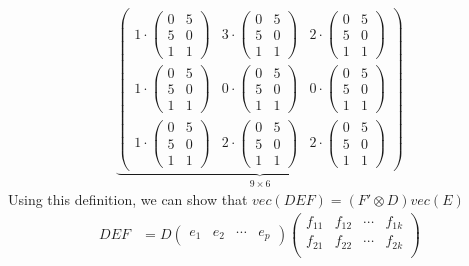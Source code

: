 \begin{enumerate}
\begin{align*}
\underbrace{\begin{pmatrix} 1\cdot\begin{pmatrix}0&5\\5&0\\1&1 \end{pmatrix}&3\cdot\begin{pmatrix}0&5\\5&0\\1&1 \end{pmatrix}&2\cdot\begin{pmatrix}0&5\\5&0\\1&1 \end{pmatrix}\\1\cdot\begin{pmatrix}0&5\\5&0\\1&1 \end{pmatrix}&0\cdot\begin{pmatrix}0&5\\5&0\\1&1 \end{pmatrix}&0\cdot\begin{pmatrix}0&5\\5&0\\1&1 \end{pmatrix}\\1\cdot\begin{pmatrix}0&5\\5&0\\1&1 \end{pmatrix}&2\cdot\begin{pmatrix}0&5\\5&0\\1&1 \end{pmatrix}&2\cdot\begin{pmatrix}0&5\\5&0\\1&1 \end{pmatrix}  \end{pmatrix}}_{9\times6}
\end{align*}
Using this definition, we can show that \(vec(DEF) = (F' \otimes D) vec(E)\)
{\footnotesize
\begin{align*}
DEF &= D \begin{pmatrix} e_1 & e_2 & \cdots  & e_p \end{pmatrix}
\begin{pmatrix}
f_{11} &f_{12} &\cdots &f_{1k} \\
f_{21} &f_{22} &\cdots &f_{2k} \\

\end{pmatrix}
\end{align*}}
\end{enumerate}
